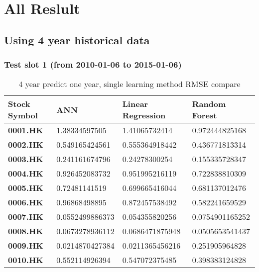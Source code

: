 \chapter{All Reslult}
\label{ch:all_result}
\section{Using 4 year historical data}

\subsection{Test slot 1 (from 2010-01-06 to 2015-01-06)}
\begin{table}[h]
	\centering
	\begin{tabular}{|l|l|l|l|}
		\hline
		\textbf{Stock Symbol} & \textbf{ANN} & \textbf{Linear Regression} & \textbf{Random Forest} \\ \hline
		\textbf{0001.HK} & 1.38334597505 & 1.41065732414 & 0.972444825168 \\ \hline
		\textbf{0002.HK} & 0.549165424561 & 0.555364918442 & 0.436771813314 \\ \hline
		\textbf{0003.HK} & 0.241161674796 & 0.24278300254 & 0.155335728347 \\ \hline
		\textbf{0004.HK} & 0.926452083732 & 0.951995216119 & 0.722838810309 \\ \hline
		\textbf{0005.HK} & 0.72481141519 & 0.699665416044 & 0.681137012476 \\ \hline
		\textbf{0006.HK} & 0.96868498895 & 0.872457538492 & 0.582241659529 \\ \hline
		\textbf{0007.HK} & 0.0552499886373 & 0.054355820256 & 0.0754901165252 \\ \hline
		\textbf{0008.HK} & 0.0673278936112 & 0.0686471875948 & 0.0505653541437 \\ \hline
		\textbf{0009.HK} & 0.0214870427384 & 0.0211365456216 & 0.251905964828 \\ \hline
		\textbf{0010.HK} & 0.552114926394 & 0.547072375485 & 0.398383124828 \\ \hline
	\end{tabular}
	\caption{4 year predict one year, single learning method RMSE compare}
	\label{tb:rmse201020151}
\end{table}


